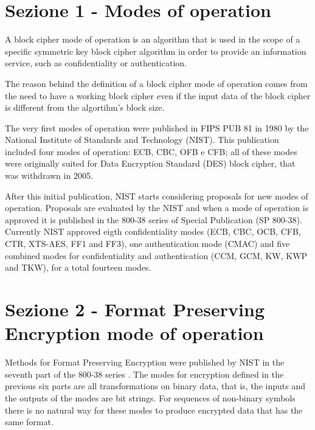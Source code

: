
\section{Sezione 1 - Modes of operation}


A block cipher mode of operation is an algorithm that is used in the scope of a specific symmetric key block cipher algorithm in order to provide an information service, such as confidentiality or authentication.

The reason behind the definition of a block cipher mode of operation comes from the need to have a working block cipher even if the input data of the block cipher is different from the algortihm's block size.

The very first modes of operation were published in FIPS PUB 81 \cite{fips81} in 1980 by the National Institute of Standards and Technology (NIST). This publication included four modes of operation: ECB, CBC, OFB e CFB; all of these modes were originally suited for Data Encryption Standard (DES) block cipher, that was withdrawn in 2005.

After this initial publication, NIST starts considering proposals for new modes of operation. Proposals are evaluated by the NIST and when a mode of operation is approved it is published in the 800-38 series of Special Publication (SP 800-38).
Currently NIST approved eigth confidentiality modes (ECB, CBC, OCB, CFB, CTR, XTS-AES, FF1 and FF3), one authentication mode (CMAC) and five combined modes for confidentiality and authentication (CCM, GCM, KW, KWP and TKW), for a total fourteen modes.

\section {Sezione 2 - Format Preserving Encryption mode of operation}

Methods for Format Preserving Encryption were published by NIST in the seventh part of the 800-38 series \cite{800-38G}. The modes for encryption defined in the previous six parts are all transformations on binary data, that is, the inputs and the outputs of the modes are bit strings.
For sequences of non-binary symbols there is no natural way for these modes to produce encrypted data that has the same format.


